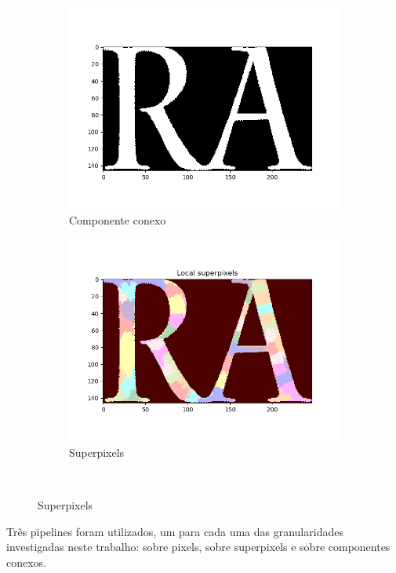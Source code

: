 \documentclass{article}
\begin{document}
		\begin{figure}[H]			
			\caption[Microrregiões]
			{Microrregiões}
			\centering
			\begin{subfigure}[b]{150px}				
				\caption{Componente conexo}
				\includegraphics[width=\textwidth]{11.png}
			\end{subfigure}
			\qquad
			\begin{subfigure}[b]{150px}				
				\caption{Superpixels}
				\includegraphics[width=\textwidth]{12.png}
			\end{subfigure}	\\	
		\end{figure}
	
		Três pipelines foram utilizados, um para cada uma das granularidades investigadas neste trabalho: sobre pixels, sobre superpixels e sobre componentes conexos. 
		
\end{document}
